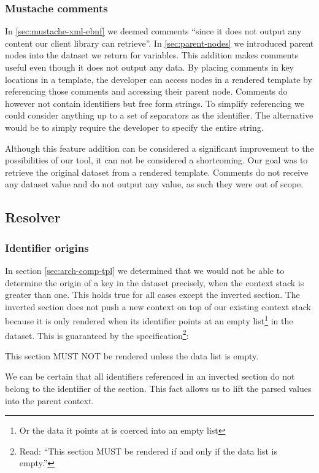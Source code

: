 \documentclass[thesis.tex]{subfiles}
\begin{document}
\subsubsection{Mustache comments}
In \ref{sec:mustache-xml-ebnf} we deemed comments ``since it does not
output any content our client library can retrieve''. In \ref{sec:parent-nodes}
we introduced parent nodes into the dataset we return for variables.
This addition makes comments useful even though it does not output any data.
By placing comments in key locations in a template, the developer can access
nodes in a rendered template by referencing those comments and accessing their
parent node. Comments do however not contain identifiers but free form strings.
To simplify referencing we could consider anything up to a set of
separators as the identifier. The alternative would be to simply require the
developer to specify the entire string.

Although this feature addition can be considered a significant improvement to
the possibilities of our tool, it can not be considered a shortcoming.
Our goal was to retrieve the original dataset from a rendered template.
Comments do not receive any dataset value and do not output any value, as such
they were out of scope.

\subsection{Resolver}

\subsubsection{Identifier origins}
In section \ref{sec:arch-comp-tpl} we determined that we would not be able to
determine the origin of a key in the dataset precisely, when the context
stack is greater than one. This holds true for all cases except the inverted
section. The inverted section does not push a new context on top of our existing
context stack because it is only rendered when its identifier points at an empty
list\footnote{
	Or the data it points at is coerced into an empty list
} in the dataset. This is guaranteed by the specification\footnote{
	Read: ``This section MUST be rendered if and only if the data list is empty.''
}:
\begin{citequote}{\cite[inverted.yml]{MSTSPEC}}
This section MUST NOT be rendered unless the data list is empty.
\end{citequote}

We can be certain that all identifiers referenced in an inverted section do not
belong to the identifier of the section. This fact allows us to lift the parsed
values into the parent context.
\end{document}

